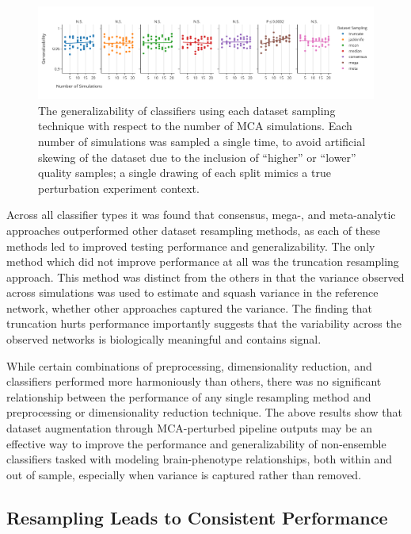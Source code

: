 \documentclass[10pt]{SelfArx} %
\begin{document}
\begin{figure}[ht]\centering
\includegraphics[width=\linewidth]{figures/3.pdf}
\caption{The generalizability of classifiers using each dataset sampling technique with respect to the number of MCA
simulations. Each number of simulations was sampled a single time, to avoid artificial skewing of the dataset due to
the inclusion of ``higher'' or ``lower'' quality samples; a single drawing of each split mimics a true perturbation
experiment context.}
\label{fig:nmca}
\end{figure}


Across all classifier types it was found that consensus, mega-, and meta-analytic approaches outperformed other dataset
resampling methods, as each of these methods led to improved testing performance and generalizability. The only method
which did not improve performance at all was the truncation resampling approach. This method was distinct from the
others in that the variance observed across simulations was used to estimate and squash variance in the reference
network, whether other approaches captured the variance. The finding that truncation hurts performance importantly
suggests that the variability across the observed networks is biologically meaningful and contains signal.

While certain combinations of preprocessing, dimensionality reduction, and classifiers performed more harmoniously than
others, there was no significant relationship between the performance of any single resampling method and preprocessing
or dimensionality reduction technique. The above results show that dataset augmentation through MCA-perturbed pipeline
outputs may be an effective way to improve the performance and generalizability of non-ensemble classifiers tasked with
modeling brain-phenotype relationships, both within and out of sample, especially when variance is captured rather than
removed.

\subsection*{Resampling Leads to Consistent Performance}
\end{document}
